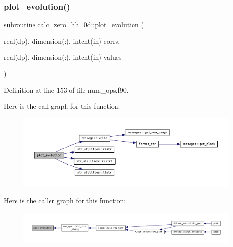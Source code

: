 \subsubsection{\texorpdfstring{plot\+\_\+evolution()}{plot\_evolution()}\hspace{0.1cm}{\footnotesize\ttfamily [1/3]}}
{\footnotesize\ttfamily subroutine calc\+\_\+zero\+\_\+hh\+\_\+0d\+::plot\+\_\+evolution (\begin{DoxyParamCaption}\item[{real(dp), dimension(\+:), intent(in)}]{corrs,  }\item[{real(dp), dimension(\+:), intent(in)}]{values }\end{DoxyParamCaption})}



Definition at line 153 of file num\+\_\+ops.\+f90.

Here is the call graph for this function\+:
\nopagebreak
\begin{figure}[H]
\begin{center}
\leavevmode
\includegraphics[width=350pt]{num__ops_8f90_a43693003de2d8d2713ff625bd461ead1_cgraph}
\end{center}
\end{figure}
Here is the caller graph for this function\+:
\nopagebreak
\begin{figure}[H]
\begin{center}
\leavevmode
\includegraphics[width=350pt]{num__ops_8f90_a43693003de2d8d2713ff625bd461ead1_icgraph}
\end{center}
\end{figure}
\mbox{\label{num__ops_8f90_a6a38b3677a2698fd1d3b59a9ee052fe1}} 
